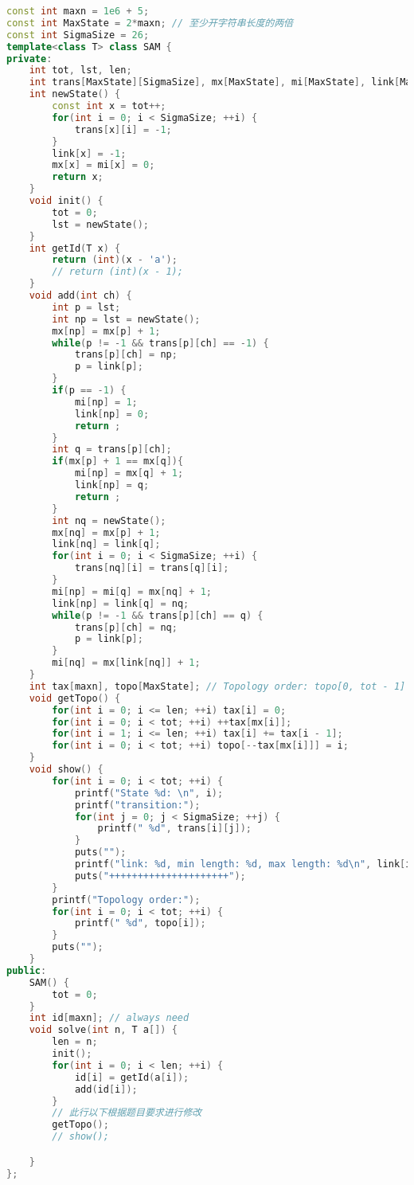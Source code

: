 \begin{lstlisting}[language=C++]
const int maxn = 1e6 + 5;
const int MaxState = 2*maxn; // 至少开字符串长度的两倍
const int SigmaSize = 26;
template<class T> class SAM {
private:
    int tot, lst, len;
    int trans[MaxState][SigmaSize], mx[MaxState], mi[MaxState], link[MaxState];
    int newState() {
        const int x = tot++;
        for(int i = 0; i < SigmaSize; ++i) {
            trans[x][i] = -1;
        }
        link[x] = -1;
        mx[x] = mi[x] = 0;
        return x;
    }
    void init() {
        tot = 0;
        lst = newState();
    }
    int getId(T x) {
        return (int)(x - 'a');
        // return (int)(x - 1);
    }
    void add(int ch) {
        int p = lst;
        int np = lst = newState();
        mx[np] = mx[p] + 1;
        while(p != -1 && trans[p][ch] == -1) {
            trans[p][ch] = np;
            p = link[p];
        }
        if(p == -1) {
            mi[np] = 1;
            link[np] = 0;
            return ;
        }
        int q = trans[p][ch];
        if(mx[p] + 1 == mx[q]){
            mi[np] = mx[q] + 1;
            link[np] = q;
            return ;
        }
        int nq = newState();
        mx[nq] = mx[p] + 1;
        link[nq] = link[q];
        for(int i = 0; i < SigmaSize; ++i) {
            trans[nq][i] = trans[q][i];
        }
        mi[np] = mi[q] = mx[nq] + 1;
        link[np] = link[q] = nq;
        while(p != -1 && trans[p][ch] == q) {
            trans[p][ch] = nq;
            p = link[p];
        }
        mi[nq] = mx[link[nq]] + 1;
    }
    int tax[maxn], topo[MaxState]; // Topology order: topo[0, tot - 1]
    void getTopo() {
        for(int i = 0; i <= len; ++i) tax[i] = 0;
        for(int i = 0; i < tot; ++i) ++tax[mx[i]];
        for(int i = 1; i <= len; ++i) tax[i] += tax[i - 1];
        for(int i = 0; i < tot; ++i) topo[--tax[mx[i]]] = i;
    }
    void show() {
        for(int i = 0; i < tot; ++i) {
            printf("State %d: \n", i);
            printf("transition:");
            for(int j = 0; j < SigmaSize; ++j) {
                printf(" %d", trans[i][j]);
            }
            puts("");
            printf("link: %d, min length: %d, max length: %d\n", link[i], mi[i], mx[i]);
            puts("+++++++++++++++++++++");
        }
        printf("Topology order:");
        for(int i = 0; i < tot; ++i) {
            printf(" %d", topo[i]);
        }
        puts("");
    }
public:
    SAM() {
        tot = 0;
    }
    int id[maxn]; // always need
    void solve(int n, T a[]) {
        len = n;
        init();
        for(int i = 0; i < len; ++i) {
            id[i] = getId(a[i]);
            add(id[i]);
        }
        // 此行以下根据题目要求进行修改
        getTopo();
        // show();

    }
};
\end{lstlisting}

